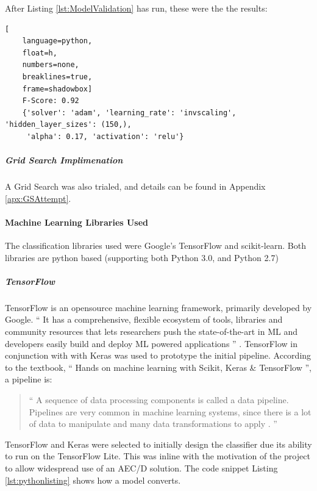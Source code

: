 \documentclass{UoNMCHA}
\newcommand{\inlineQuote}[1]{`` #1 ''}
\newcommand{\fancyquote}[1]{\begin{quotation}\inlineQuote{#1}\end{quotation}}
\newcommand{\aref}[1] {Appendix \ref{#1}}
\newcommand{\lref}[1] {Listing \ref{#1}}
\numberwithin{equation}{section}
\begin{document}
After \lref{lst:ModelValidation} has run, these were the the results:

\begin{lstlisting}[
    language=python,
    float=h,
    numbers=none,
    breaklines=true,
    frame=shadowbox]
    F-Score: 0.92
    {'solver': 'adam', 'learning_rate': 'invscaling', 'hidden_layer_sizes': (150,),
     'alpha': 0.17, 'activation': 'relu'}
\end{lstlisting}

\subparagraph{Grid Search Implimenation}
A Grid Search was also trialed, and details can be found in \aref{apx:GSAttempt}.

\paragraph{Machine Learning Libraries Used}
The classification libraries used were Google's TensorFlow and scikit-learn. Both libraries are python based (supporting both Python 3.0, and Python 2.7) \cite{scikitlearnpythonVer}\cite{TFpythonVer}

\subparagraph{TensorFlow}
TensorFlow is an opensource machine learning framework, primarily developed by Google.
\inlineQuote{It has a comprehensive, flexible ecosystem of tools, libraries and community resources that lets researchers push the state-of-the-art in ML and developers easily build and deploy ML powered applications} \cite{TFwebsite}. TensorFlow in conjunction with with Keras was used to prototype the initial pipeline. According to the textbook, \inlineQuote{Hands on machine learning with Scikit, Keras \& TensorFlow}, a pipeline is:
\fancyquote{A sequence of data processing components is called a data pipeline. Pipelines are very common in machine learning systems, since there is a lot of data to manipulate and many data transformations to apply \cite{HandsOnMLTextbook}.}

TensorFlow and Keras were selected to initially design the classifier due its ability to run on the TensorFlow Lite. This was inline with the motivation of the project to allow widespread use of an AEC/D solution. The code snippet \lref{lst:pythonlisting} shows how a model converts.


\end{document}
